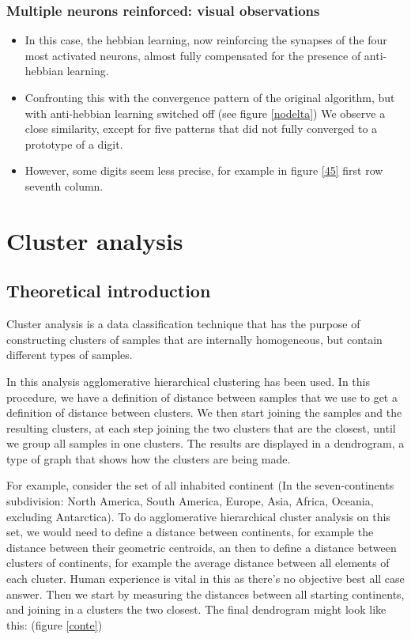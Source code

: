\documentclass[a4paper]{report}
\begin{document}
\subsection{Multiple neurons reinforced: visual observations}

\begin{itemize}
    \item In this case, the hebbian learning, now reinforcing the synapses of the four most activated neurons, almost fully compensated for the presence of anti-hebbian learning. 
    \item Confronting this with the convergence pattern of the original algorithm, but with anti-hebbian learning switched off  (see figure \ref{nodelta}) We observe a close similarity, except for five patterns that did not fully converged to a prototype of a digit.
    \item However, some digits seem less precise, for example in figure \ref{45} first row seventh column.
\end{itemize}

\chapter{Cluster analysis}

\section{Theoretical introduction}

Cluster analysis is a data classification technique that has the purpose of constructing clusters of samples that are internally homogeneous, but contain different types of samples.

In this analysis agglomerative hierarchical clustering has been used. In this procedure, we have a definition of distance between samples that we use to get a definition of distance between clusters. We then start joining the samples and the resulting clusters, at each step joining the two clusters that are the closest, until we group all samples in one clusters. The results are displayed in a dendrogram, a type of graph that shows how the clusters are being made.

For example, consider the set of all inhabited continent (In the seven-continents subdivision: North America, South America, Europe, Asia, Africa, Oceania, excluding Antarctica). To do agglomerative hierarchical cluster analysis on this set, we would need to define a distance between continents, for example the distance between their geometric centroids, an then to define a distance between clusters of continents, for example the average distance between all elements of each cluster. Human experience is vital in this as there's no objective best all case answer. Then we start by measuring the distances between all starting continents, and joining in a clusters the two closest. The final dendrogram might look like this: (figure \ref{conte})
\end{document}

